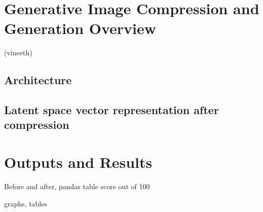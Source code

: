 \section{Generative Image Compression and Generation Overview}

(vineeth)

\subsection{Architecture}






\subsection{Latent space vector representation after compression}

\section{Outputs and Results}

Before and after, pandas table
score out of 100

graphs, tables


